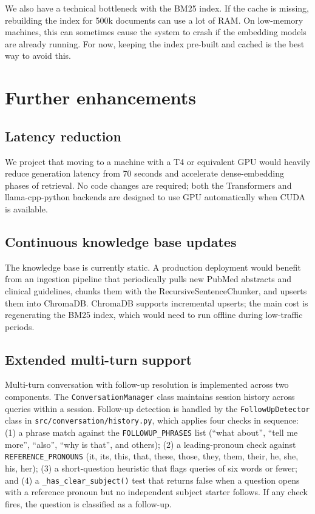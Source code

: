 We also have a technical bottleneck with the BM25 index. If the cache is missing, rebuilding the index for 500k documents can use a lot of RAM. On low-memory machines, this can sometimes cause the system to crash if the embedding models are already running. For now, keeping the index pre-built and cached is the best way to avoid this.

\section{Further enhancements}

\subsection{Latency reduction}

We project that moving to a machine with a T4 or equivalent GPU would heavily reduce generation latency from 70 seconds and accelerate dense-embedding phases of retrieval. No code changes are required; both the Transformers and llama-cpp-python backends are designed to use GPU automatically when CUDA is available.

\subsection{Continuous knowledge base updates}

The knowledge base is currently static. A production deployment would benefit from an ingestion pipeline that periodically pulls new PubMed abstracts and clinical guidelines, chunks them with the RecursiveSentenceChunker, and upserts them into ChromaDB. ChromaDB supports incremental upserts; the main cost is regenerating the BM25 index, which would need to run offline during low-traffic periods.

\subsection{Extended multi-turn support}

Multi-turn conversation with follow-up resolution is implemented across two components. The \texttt{ConversationManager} class maintains session history across queries within a session. Follow-up detection is handled by the \texttt{FollowUpDetector} class in \texttt{src/\allowbreak conversation/history.py}, which applies four checks in sequence: (1) a phrase match against the \texttt{FOLLOWUP\_PHRASES} list (``what about'', ``tell me more'', ``also'', ``why is that'', and others); (2) a leading-pronoun check against \texttt{REFERENCE\_\allowbreak PRONOUNS} (it, its, this, that, these, those, they, them, their, he, she, his, her); (3) a short-question heuristic that flags queries of six words or fewer; and (4) a \texttt{\_has\_clear\_subject()} test that returns false when a question opens with a reference pronoun but no independent subject starter follows. If any check fires, the question is classified as a follow-up.

